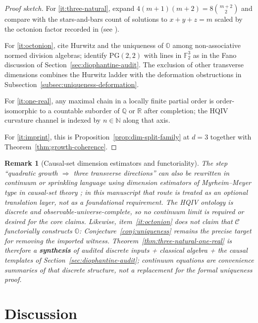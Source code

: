 \documentclass[11pt]{amsart}
\newtheorem{remark}[theorem]{Remark}
\begin{document}
\begin{proof}[Proof sketch]
For \eqref{it:three-natural}, expand \(4(m+1)(m+2)=8\binom{m+2}{2}\) and compare with the stars-and-bars count of solutions to \(x+y+z=m\) scaled by the octonion factor recorded in  (see ).

For \eqref{it:octonion}, cite Hurwitz and the uniqueness of \(\mathbb{O}\) among non-associative normed division algebras; identify \(\mathrm{PG}(2,2)\) with lines in \(\mathbb{F}_2^3\) as in the Fano discussion of Section~\ref{sec:diophantine-audit}. The exclusion of other transverse dimensions combines the Hurwitz ladder with the deformation obstructions in Subsection~\ref{subsec:uniqueness-deformation}.

For \eqref{it:one-real}, any maximal chain in a locally finite partial order is order-isomorphic to a countable suborder of \(\mathbb{Q}\) or \(\mathbb{R}\) after completion; the HQIV curvature channel is indexed by \(n\in\mathbb{N}\) along that axis.

For \eqref{it:imprint}, this is Proposition~\ref{prop:dim-split-family} at \(d=3\) together with Theorem~\ref{thm:growth-coherence}.
\end{proof}

\begin{remark}[Causal-set dimension estimators and functoriality]
\label{rem:three-natural-one-real-status}
The step ``quadratic growth \(\Rightarrow\) three transverse directions'' can also be rewritten in continuum or sprinkling language using dimension estimators of Myrheim--Meyer type in causal-set theory \cite{bombelli1987,sorkin2005}; in this manuscript that route is treated as an optional translation layer, not as a foundational requirement. The HQIV ontology is discrete and observable-universe-complete, so no continuum limit is required or desired for the core claims. Likewise, item~\eqref{it:octonion} does \emph{not} claim that \(\mathcal{C}\) functorially constructs \(\mathbb{O}\): Conjecture~\ref{conj:uniqueness} remains the precise target for removing the imported  witness. Theorem~\ref{thm:three-natural-one-real} is therefore a \textbf{synthesis} of audited discrete inputs + classical algebra + the causal templates of Section~\ref{sec:diophantine-audit}; continuum equations are convenience summaries of that discrete structure, not a replacement for the formal uniqueness proof.
\end{remark}

\section{Discussion}
\end{document}
